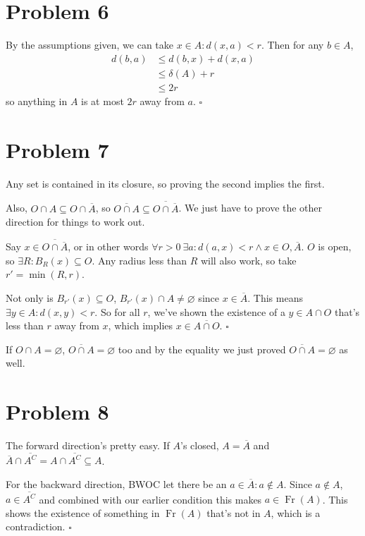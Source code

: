 \documentclass[12pt]{article}
\DeclareMathOperator{\Fr}{Fr}
\begin{document}
\section{Problem 6}

By the assumptions given, we can take $x \in A: d(x, a) < r$.
Then for any $b \in A$,
\begin{align*}
    d(b, a)
    &\le d(b, x) + d(x, a) \\
    &\le \delta(A) + r \\
    &\le 2r
\end{align*}
so anything in $A$ is at most $2r$ away from $a$. $\square$

\pagebreak

\section{Problem 7}

Any set is contained in its closure, so proving the second implies the first.

Also, $O \cap A \subseteq O \cap \overline{A}$, so $\overline{O \cap A} \subseteq \overline{O \cap \overline{A}}$.
We just have to prove the other direction for things to work out.

Say $x \in \overline{O \cap \overline{A}}$,
or in other words $\forall r > 0\ \exists a: d(a, x) < r \land x \in O, \overline{A}$.
$O$ is open, so $\exists R: B_R(x) \subseteq O$.
Any radius less than $R$ will also work, so take $r'=\min\left(R, r\right)$.

Not only is $B_{r'}(x) \subseteq O$, $B_{r'}(x) \cap A \ne \varnothing$ since $x \in \overline{A}$.
This means $\exists y \in A: d(x, y) < r$.
So for all $r$, we've shown the existence of a $y \in A \cap O$ that's less than $r$ away from $x$,
which implies $x \in \overline{A \cap O}$. $\square$

If $O \cap A = \varnothing$, $\overline{O \cap A}=\varnothing$ too and by the equality
we just proved $\overline{O \cap A}=\varnothing$ as well.

\section{Problem 8}

The forward direction's pretty easy.
If $A$'s closed, $A=\overline{A}$ and $\overline{A} \cap \overline{A^C}=A \cap \overline{A^C} \subseteq A$.

For the backward direction, BWOC let there be an $a \in \overline{A}: a \notin A$.
Since $a \notin A$, $a \in \overline{A^C}$ and combined with our earlier condition this makes $a \in \Fr(A)$.
This shows the existence of something in $\Fr(A)$ that's not in $A$, which is a contradiction. $\square$
\end{document}

